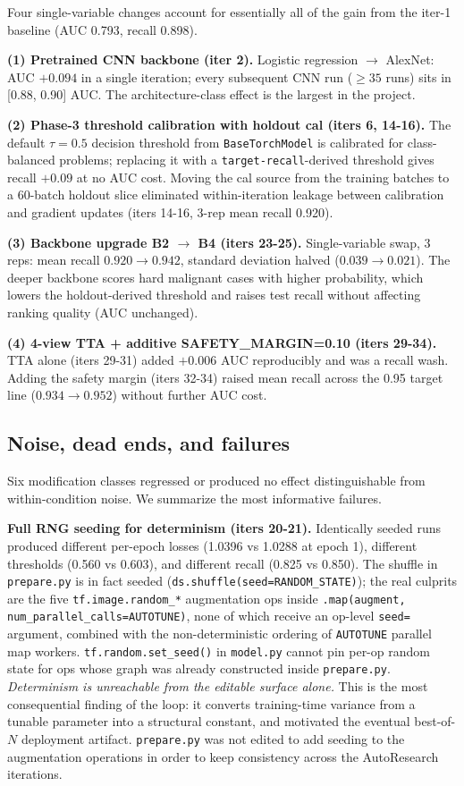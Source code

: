 \documentclass{article}
\begin{document}
Four single-variable changes account for essentially all of the gain
from the iter-1 baseline (AUC 0.793, recall 0.898).

\textbf{(1) Pretrained CNN backbone (iter 2).} Logistic regression $\to$
AlexNet: AUC $+0.094$ in a single iteration; every subsequent CNN run
($\ge 35$ runs) sits in [0.88, 0.90] AUC. The architecture-class
effect is the largest in the project.

\textbf{(2) Phase-3 threshold calibration with holdout cal (iters 6, 14-16).}
The default $\tau=0.5$ decision threshold from \texttt{BaseTorchModel}
is calibrated for class-balanced problems; replacing it with a
\texttt{target-recall}-derived threshold gives recall $+0.09$ at no AUC
cost. Moving the cal source from the training batches to a 60-batch
holdout slice eliminated within-iteration leakage between calibration
and gradient updates (iters 14-16, 3-rep mean recall 0.920).

\textbf{(3) Backbone upgrade B2 $\to$ B4 (iters 23-25).}
Single-variable swap, 3 reps: mean recall $0.920 \to 0.942$, standard
deviation halved ($0.039 \to 0.021$). The deeper backbone scores hard
malignant cases with higher probability, which lowers the holdout-derived
threshold and raises test recall without affecting ranking quality
(AUC unchanged).

\textbf{(4) 4-view TTA + additive SAFETY\_MARGIN=0.10 (iters 29-34).}
TTA alone (iters 29-31) added $+0.006$ AUC reproducibly and was a
recall wash. Adding the safety margin (iters 32-34) raised mean recall
across the 0.95 target line ($0.934 \to 0.952$) without further AUC cost.

\subsection{Noise, dead ends, and failures}

Six modification classes regressed or produced no effect distinguishable
from within-condition noise. We summarize the most informative failures.

\textbf{Full RNG seeding for determinism (iters 20-21).} Identically seeded
runs produced different per-epoch losses (1.0396 vs 1.0288 at epoch 1),
different thresholds (0.560 vs 0.603), and different recall
(0.825 vs 0.850). The shuffle in \texttt{prepare.py} is in fact seeded
(\texttt{ds.shuffle(seed=RANDOM\_STATE)}); the real culprits are the
five \texttt{tf.image.random\_*} augmentation ops inside
\texttt{.map(augment, num\_parallel\_calls=AUTOTUNE)}, none of which
receive an op-level \texttt{seed=} argument, combined with the
non-deterministic ordering of \texttt{AUTOTUNE} parallel map workers.
\texttt{tf.random.set\_seed()} in \texttt{model.py} cannot pin per-op
random state for ops whose graph was already constructed inside
\texttt{prepare.py}. \emph{Determinism is unreachable from the editable
surface alone.} This is the most consequential finding of the loop: it
converts training-time variance from a tunable parameter into a structural
constant, and motivated the eventual best-of-$N$ deployment artifact.
\texttt{prepare.py} was not edited to add seeding to the augmentation
operations in order to keep consistency across the AutoResearch
iterations.
\end{document}
